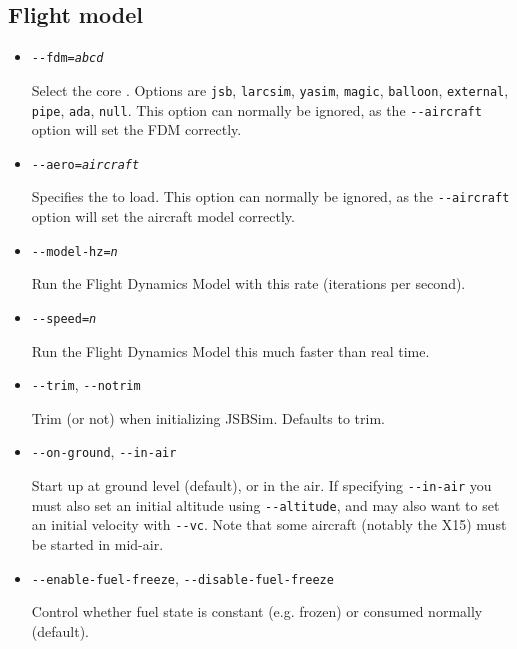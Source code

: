 \subsection{Flight model}\label{flight dynamics model}
\begin{itemize}
\item{\texttt{-$ $-fdm={\it abcd}}}

Select the core . Options are \texttt{jsb}, \texttt{larcsim}, \texttt{yasim},
\texttt{magic}, \texttt{balloon}, \texttt{external}, \texttt{pipe}, \texttt{ada}, \texttt{null}.
This option can normally be ignored, as the \texttt{-$ $-aircraft} option will set the FDM correctly.

\item{\texttt{-$ $-aero={\it aircraft}}}

Specifies the  to load. This option can normally be ignored, as
the \texttt{-$ $-aircraft} option will set the aircraft model correctly.

\item{\texttt{-$ $-model-hz={\it n}}}

Run the Flight Dynamics Model with this rate (iterations per second).

\item{\texttt{-$ $-speed={\it n}}}

Run the Flight Dynamics Model this much faster than real time.

\item{\texttt{-$ $-trim}, \texttt{-$ $-notrim}}

Trim (or not) when initializing JSBSim. Defaults to trim.

\item{\texttt{-$ $-on-ground}, \texttt{-$ $-in-air}}

Start up at ground level (default), or in the air. If specifying \texttt{-$ $-in-air} you
must also set an initial altitude using \texttt{-$ $-altitude}, and may also want to set
an initial velocity with \texttt{-$ $-vc}. Note that some aircraft (notably the X15) must
be started in mid-air.

\item{\texttt{-$ $-enable-fuel-freeze}, \texttt{-$ $-disable-fuel-freeze}}

Control whether fuel state is constant (e.g. frozen) or consumed normally (default).

\end{itemize}

